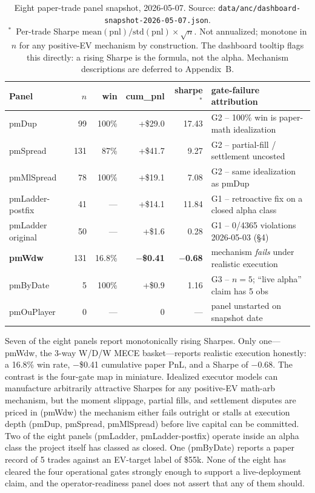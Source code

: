 \documentclass[11pt]{article}
\begin{document}
\begin{table}[t]
\centering
\small
\begin{tabular}{lrrrrl}
\toprule
Panel & $n$ & win & cum\_pnl & sharpe$^\ast$ & gate-failure attribution \\
\midrule
pmDup              &  99 & 100\%  & +\$29.0 & 17.43  & G2 -- 100\% win is paper-math idealization \\
pmSpread           & 131 &  87\%  & +\$41.7 &  9.27  & G2 -- partial-fill / settlement uncosted \\
pmMlSpread         &  78 & 100\%  & +\$19.1 &  7.08  & G2 -- same idealization as pmDup \\
pmLadder-postfix   &  41 &   ---  & +\$14.1 & 11.84  & G1 -- retroactive fix on a closed alpha class \\
pmLadder original  &  50 &   ---  &  +\$1.6 &  0.28  & G1 -- 0/4365 violations 2026-05-03 (\S4) \\
\textbf{pmWdw}     & 131 & 16.8\% & \textbf{$-$\$0.41} & \textbf{$-$0.68} & mechanism \emph{fails} under realistic execution \\
pmByDate           &   5 & 100\%  &  +\$0.9 &  1.16  & G3 -- $n{=}5$; ``live alpha'' claim has 5 obs \\
pmOuPlayer         &   0 &   ---  &      0  &   ---  & panel unstarted on snapshot date \\
\bottomrule
\end{tabular}
\caption{Eight paper-trade panel snapshot, 2026-05-07. Source: \texttt{data/anc/dashboard-snapshot-2026-05-07.json}. \\$^\ast$~Per-trade Sharpe $\mathrm{mean}(\mathrm{pnl})/\mathrm{std}(\mathrm{pnl})\times\sqrt{n}$. Not annualized; monotone in $n$ for any positive-EV mechanism by construction. The dashboard tooltip flags this directly: a rising Sharpe is the formula, not the alpha. Mechanism descriptions are deferred to Appendix~B.}
\label{tab:eight-panels}
\end{table}

Seven of the eight panels report monotonically rising Sharpes. Only one---pmWdw, the 3-way W/D/W MECE basket---reports realistic execution honestly: a 16.8\% win rate, $-$\$0.41 cumulative paper PnL, and a Sharpe of $-$0.68. The contrast is the four-gate map in miniature. Idealized executor models can manufacture arbitrarily attractive Sharpes for any positive-EV math-arb mechanism, but the moment slippage, partial fills, and settlement disputes are priced in (pmWdw) the mechanism either fails outright or stalls at execution depth (pmDup, pmSpread, pmMlSpread) before live capital can be committed. Two of the eight panels (pmLadder, pmLadder-postfix) operate inside an alpha class the project itself has classed as closed. One (pmByDate) reports a paper record of 5 trades against an EV-target label of \$55k. None of the eight has cleared the four operational gates strongly enough to support a live-deployment claim, and the operator-readiness panel does not assert that any of them should.
\end{document}
